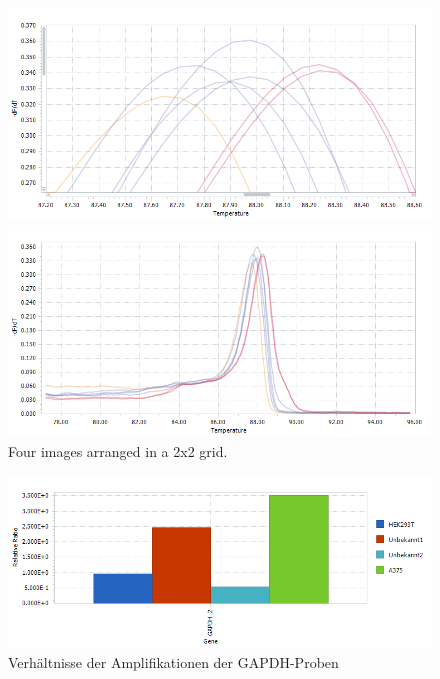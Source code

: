 \documentclass{article}
\begin{document}
\begin{figure}[ht]
    \begin{minipage}[b]{0.45\textwidth}
        \centering
        \includegraphics[width=\textwidth]{images/cycler/mc2.png}
    \end{minipage}
    \begin{minipage}[b]{0.45\textwidth}
        \centering
        \includegraphics[width=\textwidth]{images/cycler/meltingcurves.png}
    \end{minipage}
    \caption{Four images arranged in a 2x2 grid.}
    \label{fig:2x2images}
\end{figure}
\begin{figure}[H]
    \centering
    \includegraphics[width=\textwidth]{images/cycler/G1_2_G2.png}
    \caption{Verhältnisse der Amplifikationen der GAPDH-Proben}
    \label{fig:gapdh}
\end{figure}
\end{document}
